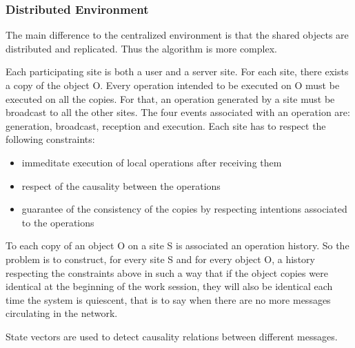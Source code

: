 \subsubsection{Distributed Environment}
The main difference to the centralized environment is that the shared objects are distributed and replicated. Thus the algorithm is more complex.

Each participating site is both a user and a server site. For each site, there exists a copy of the object O. Every operation intended to be executed on O must be executed on all the copies. For that, an operation generated by a site must be broadcast to all the other sites. The four events associated with an operation are: generation, broadcast, reception and execution.
Each site has to respect the following constraints:
\begin{itemize}
 \item immeditate execution of local operations after receiving them
 \item respect of the causality between the operations
 \item guarantee of the consistency of the copies by respecting intentions associated to the operations
\end{itemize}
To each copy of an object O on a site S is associated an operation history. So the problem is to construct, for every site S and for every object O, a history respecting the constraints above in such a way that if the object copies were identical at the beginning of the work session, they will also be identical each time the system is quiescent, that is to say when there are no more messages circulating in the network.

State vectors are used to detect causality relations between different messages.



